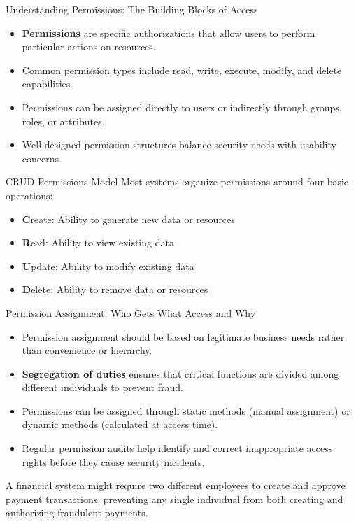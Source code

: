\documentclass{beamer}
\begin{document}
\begin{frame}{Understanding Permissions: The Building Blocks of Access}
    \begin{itemize}
        \item \textbf{Permissions} are specific authorizations that allow users to perform particular actions on resources.
        \item Common permission types include read, write, execute, modify, and delete capabilities.
        \item Permissions can be assigned directly to users or indirectly through groups, roles, or attributes.
        \item Well-designed permission structures balance security needs with usability concerns.
    \end{itemize}
    
    \begin{block}{CRUD Permissions Model}
        Most systems organize permissions around four basic operations:
        \begin{itemize}
            \item \textbf{C}reate: Ability to generate new data or resources
            \item \textbf{R}ead: Ability to view existing data
            \item \textbf{U}pdate: Ability to modify existing data
            \item \textbf{D}elete: Ability to remove data or resources
        \end{itemize}
    \end{block}
\end{frame}

\begin{frame}{Permission Assignment: Who Gets What Access and Why}
    \begin{itemize}
        \item Permission assignment should be based on legitimate business needs rather than convenience or hierarchy.
        \item \textbf{Segregation of duties} ensures that critical functions are divided among different individuals to prevent fraud.
        \item Permissions can be assigned through static methods (manual assignment) or dynamic methods (calculated at access time).
        \item Regular permission audits help identify and correct inappropriate access rights before they cause security incidents.
    \end{itemize}
    
    \begin{example}
        A financial system might require two different employees to create and approve payment transactions, preventing any single individual from both creating and authorizing fraudulent payments.
    \end{example}
\end{frame}
\end{document}
